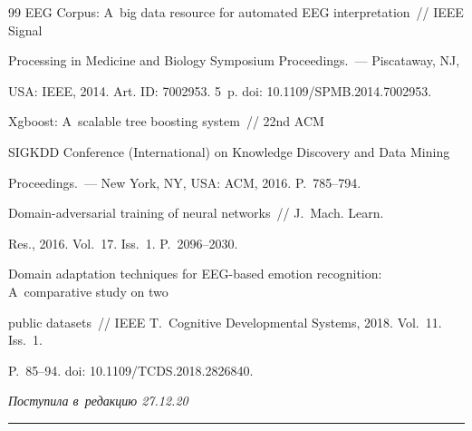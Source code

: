 {{\begin{thebibliography}{99}
EEG Corpus: A~big data resource for automated EEG interpretation~/\!\!/ IEEE Signal 

Processing in Medicine and Biology Symposium Proceedings.~--- Piscataway, NJ, 

USA: IEEE, 2014. Art. ID: 7002953. 5~p. doi: 10.1109\!/\!SPMB.2014.7002953.


   Xgboost: A~scalable tree boosting system~/\!\!/ 22nd ACM 

SIGKDD  Conference (International)  on Knowledge Discovery and Data Mining  

Proceedings.~--- New York, NY, USA: ACM, 2016. P.~785--794.


   Domain-adversarial training of neural networks~/\!\!/ J.~Mach. Learn. 

Res., 2016. Vol.~17. Iss.~1. P.~2096--2030.



Domain adaptation techniques for EEG-based emotion recognition: A~comparative study on two 

public datasets~/\!\!/ IEEE T.~Cognitive Developmental Systems, 2018. Vol.~11. Iss.~1. 

P.~85--94. doi: 10.1109\!/\!TCDS.2018.2826840.

      \end{thebibliography}

} }







\vspace*{-3pt}



\hfill{\small\textit{Поступила в~редакцию 27.12.20}}









\vspace*{6pt}



\hrule



